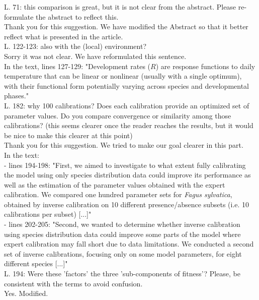 \documentclass[a4paper, 11pt]{article}
\begin{document}
\clearpage
\noindent L. 71: this comparison is great, but it is not clear from the abstract. Please re-formulate the abstract to reflect this.\\
\textcolor{customblue}{Thank you for this suggestion. We have modified the Abstract so that it better reflect what is presented in the article.}\\

\noindent L. 122-123: also with the (local) environment?\\
\textcolor{customblue}{Sorry it was not clear. We have reformulated this sentence.}\\
In the text, lines 127-129: \textcolor{customred}{"Development rates ($R$) are response functions to daily temperature that can be linear or nonlinear (usually with a single optimum), with their functional form potentially varying across species and developmental phases."}\\

\noindent L. 182: why 100 calibrations? Does each calibration provide an optimized set of parameter values. Do you compare convergence or similarity among those calibrations? (this seems clearer once the reader reaches the results, but it would be nice to make this clearer at this point)\\
\textcolor{customblue}{Thank you for this suggestion. We tried to make our goal clearer in this part.}\\
In the text:\\
- lines 194-198: \textcolor{customred}{"First, we aimed to investigate to what extent fully calibrating the model using only species distribution data could improve its performance as well as the estimation of the parameter values obtained with the expert calibration. We compared one hundred parameter sets for \emph{Fagus sylvatica}, obtained by inverse calibration on 10 different presence/absence subsets (i.e. 10 calibrations per subset) [...]"}\\
- lines 202-205: \textcolor{customred}{"Second, we wanted to determine whether inverse calibration using species distribution data could improve some parts of the model where expert calibration may fall short due to data limitations. We conducted a second set of inverse calibrations, focusing only on some model parameters, for eight different species [...]"}\\

\noindent L. 194: Were these 'factors' the three 'sub-components of fitness'? Please, be consistent with the terms to avoid confusion.\\
\textcolor{customblue}{Yes. Modified.}\\
\end{document}
